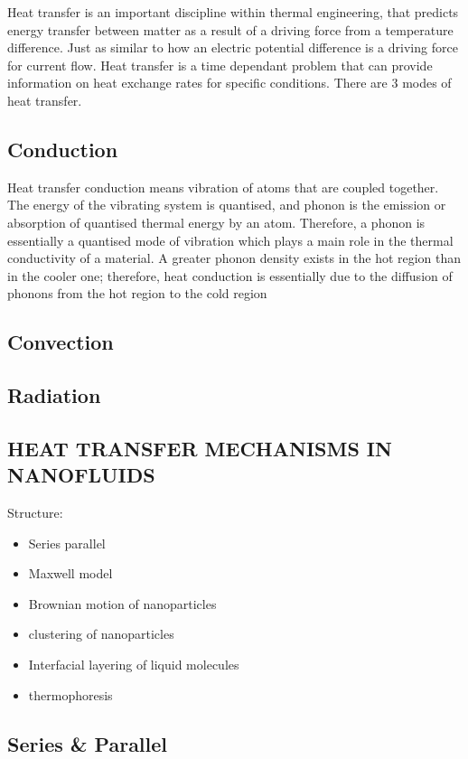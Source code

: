 \documentclass{article}
\begin{document}
Heat transfer is an important discipline within thermal engineering, that predicts energy transfer between matter as a result of a driving force from a temperature difference. Just as similar to how an electric potential difference is a driving force for current flow. Heat transfer is a time dependant problem that can provide information on heat exchange rates for specific conditions. There are 3 modes of heat transfer.
 
\subsection{Conduction}
Heat transfer conduction means vibration of atoms that are coupled together. The energy
of the vibrating system is quantised, and phonon is the emission or absorption of quantised
thermal energy by an atom. Therefore, a phonon is essentially a quantised mode of vibration
which plays a main role in the thermal conductivity of a material. A greater phonon density
exists in the hot region than in the cooler one; therefore, heat conduction is essentially due to the diffusion of phonons from the hot region to the cold region \label{}
\subsection{Convection}
\subsection{Radiation}

	
\newpage
	\subsection{HEAT TRANSFER MECHANISMS IN NANOFLUIDS}
	Structure:
	\begin{itemize}
		\item Series parallel 		
		\item Maxwell model	 	
	 	\item Brownian motion of nanoparticles
	 	\item clustering of nanoparticles
	 	\item Interfacial layering of liquid molecules
	 	\item thermophoresis
	\end{itemize}

	\subsection{Series \& Parallel}
\end{document}
